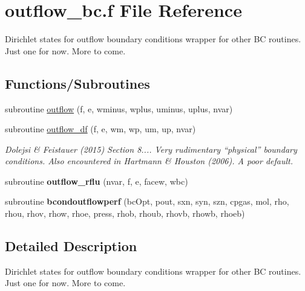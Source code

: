 \hypertarget{outflow__bc_8f}{\section{outflow\-\_\-bc.\-f File Reference}
\label{outflow__bc_8f}
}


Dirichlet states for outflow boundary conditions wrapper for other B\-C routines. Just one for now. More to come.  


\subsection*{Functions/\-Subroutines}
\begin{DoxyCompactItemize}
\item 
subroutine \hyperlink{outflow__bc_8f_ac197c7083c48cd1062073f9c2b56b573}{outflow} (f, e, wminus, wplus, uminus, uplus, nvar)
\item 
subroutine \hyperlink{group__isurf_ga0293ec162f23a55a9e89cf0797cbf2b2}{outflow\-\_\-df} (f, e, wm, wp, um, up, nvar)
\begin{DoxyCompactList}\small\item\em Dolejsi \& Feistauer (2015) Section 8.... Very rudimentary ``physical'' boundary conditions. Also encountered in Hartmann \& Houston (2006). A poor default. \end{DoxyCompactList}\item 
\hypertarget{outflow__bc_8f_a97fe193b365ccda49446db3dab8bf08d}{subroutine {\bfseries outflow\-\_\-rflu} (nvar, f, e, facew, wbc)}\label{outflow__bc_8f_a97fe193b365ccda49446db3dab8bf08d}

\item 
\hypertarget{outflow__bc_8f_a52d692beffa8873b023900968d713a1c}{subroutine {\bfseries bcondoutflowperf} (bc\-Opt, pout, sxn, syn, szn, cpgas, mol, rho, rhou, rhov, rhow, rhoe, press, rhob, rhoub, rhovb, rhowb, rhoeb)}\label{outflow__bc_8f_a52d692beffa8873b023900968d713a1c}

\end{DoxyCompactItemize}


\subsection{Detailed Description}
Dirichlet states for outflow boundary conditions wrapper for other B\-C routines. Just one for now. More to come. 


